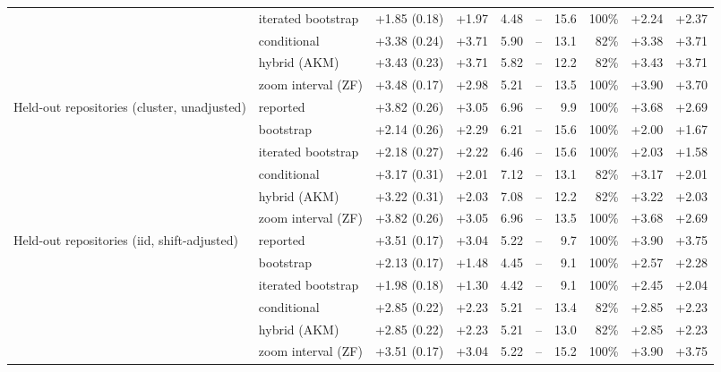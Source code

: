 \begin{tabular}{llrrrrrrrr}
 & iterated bootstrap & +1.85 (0.18) & +1.97 & 4.48 & -- & 15.6 & 100\% & +2.24 & +2.37 \\
 & conditional & +3.38 (0.24) & +3.71 & 5.90 & -- & 13.1 & 82\% & +3.38 & +3.71 \\
 & hybrid (AKM) & +3.43 (0.23) & +3.71 & 5.82 & -- & 12.2 & 82\% & +3.43 & +3.71 \\
 & zoom interval (ZF) & +3.48 (0.17) & +2.98 & 5.21 & -- & 13.5 & 100\% & +3.90 & +3.70 \\
\addlinespace
Held-out repositories (cluster, unadjusted) & reported & +3.82 (0.26) & +3.05 & 6.96 & -- & 9.9 & 100\% & +3.68 & +2.69 \\
 & bootstrap & +2.14 (0.26) & +2.29 & 6.21 & -- & 15.6 & 100\% & +2.00 & +1.67 \\
 & iterated bootstrap & +2.18 (0.27) & +2.22 & 6.46 & -- & 15.6 & 100\% & +2.03 & +1.58 \\
 & conditional & +3.17 (0.31) & +2.01 & 7.12 & -- & 13.1 & 82\% & +3.17 & +2.01 \\
 & hybrid (AKM) & +3.22 (0.31) & +2.03 & 7.08 & -- & 12.2 & 82\% & +3.22 & +2.03 \\
 & zoom interval (ZF) & +3.82 (0.26) & +3.05 & 6.96 & -- & 13.5 & 100\% & +3.68 & +2.69 \\
\addlinespace
Held-out repositories (iid, shift-adjusted) & reported & +3.51 (0.17) & +3.04 & 5.22 & -- & 9.7 & 100\% & +3.90 & +3.75 \\
 & bootstrap & +2.13 (0.17) & +1.48 & 4.45 & -- & 9.1 & 100\% & +2.57 & +2.28 \\
 & iterated bootstrap & +1.98 (0.18) & +1.30 & 4.42 & -- & 9.1 & 100\% & +2.45 & +2.04 \\
 & conditional & +2.85 (0.22) & +2.23 & 5.21 & -- & 13.4 & 82\% & +2.85 & +2.23 \\
 & hybrid (AKM) & +2.85 (0.22) & +2.23 & 5.21 & -- & 13.0 & 82\% & +2.85 & +2.23 \\
 & zoom interval (ZF) & +3.51 (0.17) & +3.04 & 5.22 & -- & 15.2 & 100\% & +3.90 & +3.75 \\
\bottomrule
\end{tabular}
